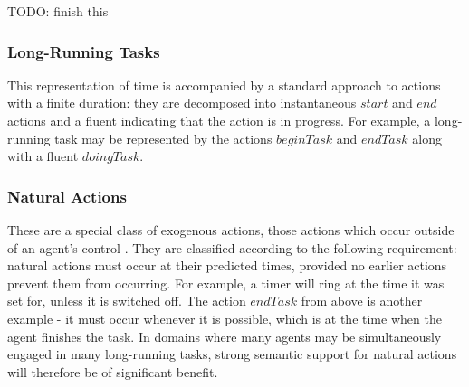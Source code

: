 TODO: finish this


\subsubsection{Long-Running Tasks}

This representation of time is accompanied by a standard approach
to actions with a finite duration: they are decomposed into instantaneous
$start$ and $end$ actions and a fluent indicating that the action
is in progress. For example, a long-running task may be represented
by the actions $beginTask$ and $endTask$ along with a fluent $doingTask$.


\subsubsection{Natural Actions}

These are a special class of exogenous actions, those actions which
occur outside of an agent's control \citep{reiter96sc_nat_conc}.
They are classified according to the following requirement: natural
actions must occur at their predicted times, provided no earlier actions
prevent them from occurring. For example, a timer will ring at the
time it was set for, unless it is switched off. The action $endTask$
from above is another example - it must occur whenever it is possible,
which is at the time when the agent finishes the task. In domains
where many agents may be simultaneously engaged in many long-running
tasks, strong semantic support for natural actions will therefore
be of significant benefit.

